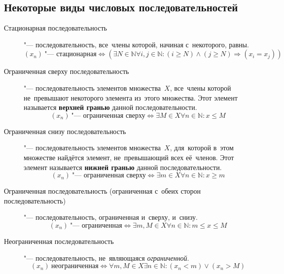 \documentclass[]{scrartcl}
\begin{document}
{{\subsection{Некоторые виды числовых последовательностей}
\begin{description}
	\item[Стационарная последовательность] "--- последовательность, все~члены которой, начиная с~некоторого, равны.
	\begin{equation}\label{eq:stational-sequence}
	(x_n)\ \text{"--- стационарная} \Leftrightarrow (\exists N \in \mathbb{N} \forall i,j \in \mathbb{N}: (i\geq N)\wedge(j\geq N)\Rightarrow(x_i=x_j))
	\end{equation}
	\item[Ограниченная сверху последовательность] "--- последовательность элементов множества~${\textstyle X}$, все~члены которой не~превышают некоторого элемента из~этого множества. Этот элемент называется \textbf{верхней гранью} данной последовательности.
	\begin{equation}\label{eq:sequence-with-top-limit}
	(x_n)\ \text{"--- ограниченная сверху} \Leftrightarrow \exists M \in X \forall n \in \mathbb{N}: x \leq M
	\end{equation}
	\item[Ограниченная снизу последовательность] "--- последовательность элементов множества~${\textstyle X}$, для~которой в~этом множестве найдётся элемент, не~превышающий всех её~членов. Этот элемент называется \textbf{нижней гранью} данной последовательности.
	\begin{equation}\label{eq:sequence-with-bottom-limit}
	(x_n)\ \text{"--- ограниченная сверху} \Leftrightarrow \exists m \in X \forall n \in \mathbb{N}: x \geq m
	\end{equation}
	\item[Ограниченная последовательность (ограниченная с~обеих сторон последовательность)] "--- последовательность, ограниченная и~сверху, и~снизу.
	\begin{equation}\label{eq:sequence-with-top-bottom-limit}
	(x_n)\ \text{"--- ограниченная} \Leftrightarrow \exists m,M \in X \forall n \in \mathbb{N}: m \leq x \leq M
	\end{equation}
	\item[Неограниченная последовательность] "--- последовательность, не~являющаяся \emph{ограниченной}.
	\begin{equation}\label{eq:sequence-with-no-limit}
	(x_n)\ \text{неограниченная} \Leftrightarrow \forall m,M \in X \exists n \in \mathbb{N}:(x_n<m) \vee (x_n>M)
	\end{equation}
\end{description}

}}
\end{document}
